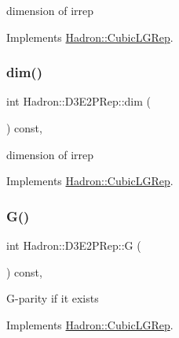 dimension of irrep 

Implements \mbox{\hyperlink{structHadron_1_1CubicLGRep_a3acbaea26503ed64f20df693a48e4cdd}{Hadron\+::\+Cubic\+L\+G\+Rep}}.

\mbox{\label{structHadron_1_1D3E2PRep_a8447155b89a2ca82aa11d902df9c3eb7}} 
\subsubsection{\texorpdfstring{dim()}{dim()}\hspace{0.1cm}{\footnotesize\ttfamily [2/2]}}
{\footnotesize\ttfamily int Hadron\+::\+D3\+E2\+P\+Rep\+::dim (\begin{DoxyParamCaption}{ }\end{DoxyParamCaption}) const\hspace{0.3cm}{\ttfamily [inline]}, {\ttfamily [virtual]}}

dimension of irrep 

Implements \mbox{\hyperlink{structHadron_1_1CubicLGRep_a3acbaea26503ed64f20df693a48e4cdd}{Hadron\+::\+Cubic\+L\+G\+Rep}}.

\mbox{\label{structHadron_1_1D3E2PRep_a2276ccf0f9c47ff521ba936da1f50e6d}} 
\subsubsection{\texorpdfstring{G()}{G()}\hspace{0.1cm}{\footnotesize\ttfamily [1/2]}}
{\footnotesize\ttfamily int Hadron\+::\+D3\+E2\+P\+Rep\+::G (\begin{DoxyParamCaption}{ }\end{DoxyParamCaption}) const\hspace{0.3cm}{\ttfamily [inline]}, {\ttfamily [virtual]}}

G-\/parity if it exists 

Implements \mbox{\hyperlink{structHadron_1_1CubicLGRep_ace26f7b2d55e3a668a14cb9026da5231}{Hadron\+::\+Cubic\+L\+G\+Rep}}.

\mbox{\label{structHadron_1_1D3E2PRep_a2276ccf0f9c47ff521ba936da1f50e6d}} 
